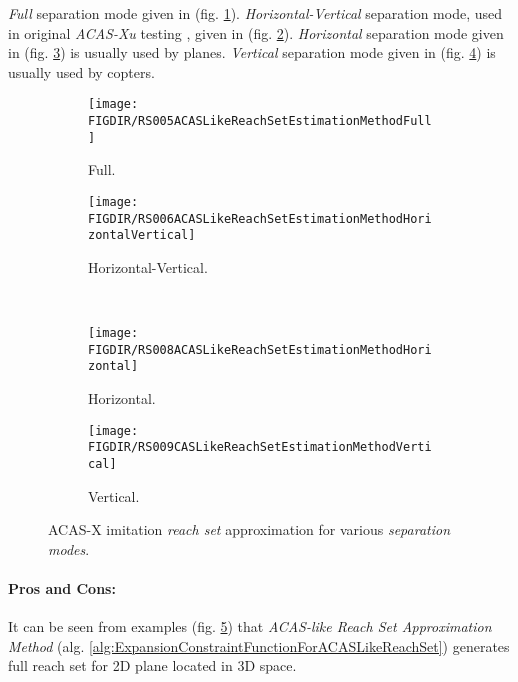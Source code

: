 \emph{Full} separation mode given in (fig. \ref{fig:acasLikeReachSetFull}). \emph{Horizontal-Vertical} separation mode, used in original \emph{ACAS-Xu} testing \cite{marston2015acas}, given in (fig. \ref{fig:acasLikeReachSetHorizontalVertical}). \emph{Horizontal} separation mode given in (fig. \ref{fig:acasLikeReachSetHorizontalOnly}) is usually used by planes. \emph{Vertical} separation mode given in (fig. \ref{fig:acasLikeReachSetVerticalOnly}) is usually used by copters.

\begin{figure}[H]
	\centering
    \begin{subfigure}{0.48\textwidth}
        \texttt{[image: \\FIGDIR/RS005ACASLikeReachSetEstimationMethodFull]}
        \caption{Full.}
        \label{fig:acasLikeReachSetFull}
    \end{subfigure}
    \begin{subfigure}{0.48\textwidth}
        \texttt{[image: \\FIGDIR/RS006ACASLikeReachSetEstimationMethodHorizontalVertical]} 
        \caption{Horizontal-Vertical.}
        \label{fig:acasLikeReachSetHorizontalVertical}
    \end{subfigure}
    \\
    \begin{subfigure}{0.48\textwidth}
        \texttt{[image: \\FIGDIR/RS008ACASLikeReachSetEstimationMethodHorizontal]} 
        \caption{Horizontal.}
        \label{fig:acasLikeReachSetHorizontalOnly}
    \end{subfigure}
    \begin{subfigure}{0.48\textwidth}
        \texttt{[image: \\FIGDIR/RS009CASLikeReachSetEstimationMethodVertical]} 
        \caption{Vertical.}
        \label{fig:acasLikeReachSetVerticalOnly}
    \end{subfigure}
    \caption{ACAS-X imitation \emph{reach set} approximation for various \emph{separation modes}. }
    \label{fig:acasLikeReachSetVariousSeparationMode}
\end{figure}

\paragraph{Pros and Cons:} It can be seen from examples (fig. \ref{fig:acasLikeReachSetVariousSeparationMode}) that \emph{ACAS-like Reach Set Approximation Method} (alg. \ref{alg:ExpansionConstraintFunctionForACASLikeReachSet}) generates full reach set for 2D plane located in 3D space. 

